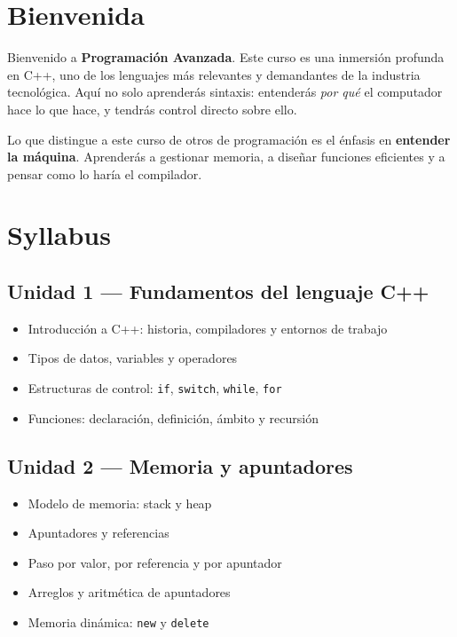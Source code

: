 \documentclass[12pt, oneside]{article}
\begin{document}

\tableofcontents
\newpage

\section{Bienvenida}

Bienvenido a \textbf{Programación Avanzada}. Este curso es una inmersión
profunda en C++, uno de los lenguajes más relevantes y demandantes de la
industria tecnológica. Aquí no solo aprenderás sintaxis: entenderás
\textit{por qué} el computador hace lo que hace, y tendrás control directo
sobre ello.

\begin{recuerda}
  Lo que distingue a este curso de otros de programación es el énfasis en
  \textbf{entender la máquina}. Aprenderás a gestionar memoria, a diseñar
  funciones eficientes y a pensar como lo haría el compilador.
\end{recuerda}

\section{Syllabus}

\subsection{Unidad 1 — Fundamentos del lenguaje C++}
\begin{itemize}
  \item Introducción a C++: historia, compiladores y entornos de trabajo
  \item Tipos de datos, variables y operadores
  \item Estructuras de control: \texttt{if}, \texttt{switch}, \texttt{while},
        \texttt{for}
  \item Funciones: declaración, definición, ámbito y recursión
\end{itemize}

\subsection{Unidad 2 — Memoria y apuntadores}
\begin{itemize}
  \item Modelo de memoria: stack y heap
  \item Apuntadores y referencias
  \item Paso por valor, por referencia y por apuntador
  \item Arreglos y aritmética de apuntadores
  \item Memoria dinámica: \texttt{new} y \texttt{delete}
\end{itemize}
\end{document}
